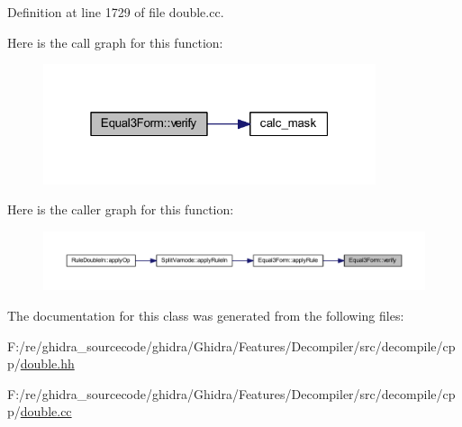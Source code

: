 Definition at line 1729 of file double.\+cc.

Here is the call graph for this function\+:
\nopagebreak
\begin{figure}[H]
\begin{center}
\leavevmode
\includegraphics[width=277pt]{class_equal3_form_a42fb0cf61a43874fa11a7087a1877eec_cgraph}
\end{center}
\end{figure}
Here is the caller graph for this function\+:
\nopagebreak
\begin{figure}[H]
\begin{center}
\leavevmode
\includegraphics[width=350pt]{class_equal3_form_a42fb0cf61a43874fa11a7087a1877eec_icgraph}
\end{center}
\end{figure}


The documentation for this class was generated from the following files\+:\begin{DoxyCompactItemize}
\item 
F\+:/re/ghidra\+\_\+sourcecode/ghidra/\+Ghidra/\+Features/\+Decompiler/src/decompile/cpp/\mbox{\hyperlink{double_8hh}{double.\+hh}}\item 
F\+:/re/ghidra\+\_\+sourcecode/ghidra/\+Ghidra/\+Features/\+Decompiler/src/decompile/cpp/\mbox{\hyperlink{double_8cc}{double.\+cc}}\end{DoxyCompactItemize}
